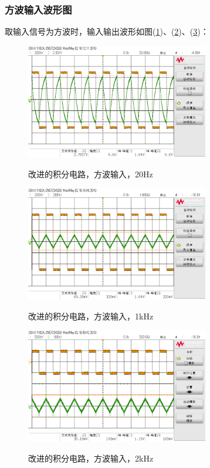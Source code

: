 \documentclass[a4paper]{article}
\begin{document}
\subsubsection{方波输入波形图}
取输入信号为方波时，输入输出波形如图(\ref{20Hz_int_s})、(\ref{1kHz_int_s})、(\ref{2kHz_int_s})：
\begin{figure}[!h]
\centering
\includegraphics[width=8cm]{fig/scope_1.png}\\
\caption{改进的积分电路，方波输入，20Hz}\label{20Hz_int_s}
\end{figure}
\begin{figure}[!h]
\centering
\includegraphics[width=8cm]{fig/scope_2.png}\\
\caption{改进的积分电路，方波输入，1kHz}\label{1kHz_int_s}
\end{figure}
\begin{figure}[!h]
\centering
\includegraphics[width=8cm]{fig/scope_3.png}\\
\caption{改进的积分电路，方波输入，2kHz}\label{2kHz_int_s}
\end{figure}
\newpage
\end{document}
